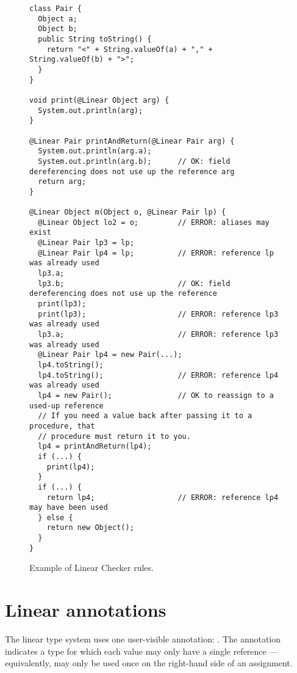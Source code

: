 \begin{figure}
\begin{smaller}
\begin{Verbatim}
class Pair {
  Object a;
  Object b;
  public String toString() {
    return "<" + String.valueOf(a) + "," + String.valueOf(b) + ">";
  }
}

void print(@Linear Object arg) {
  System.out.println(arg);
}

@Linear Pair printAndReturn(@Linear Pair arg) {
  System.out.println(arg.a);
  System.out.println(arg.b);      // OK: field dereferencing does not use up the reference arg
  return arg;
}

@Linear Object m(Object o, @Linear Pair lp) {
  @Linear Object lo2 = o;         // ERROR: aliases may exist
  @Linear Pair lp3 = lp;          
  @Linear Pair lp4 = lp;          // ERROR: reference lp was already used
  lp3.a;                            
  lp3.b;                          // OK: field dereferencing does not use up the reference
  print(lp3);
  print(lp3);                     // ERROR: reference lp3 was already used
  lp3.a;                          // ERROR: reference lp3 was already used
  @Linear Pair lp4 = new Pair(...);
  lp4.toString();
  lp4.toString();                 // ERROR: reference lp4 was already used
  lp4 = new Pair();               // OK to reassign to a used-up reference
  // If you need a value back after passing it to a procedure, that
  // procedure must return it to you.
  lp4 = printAndReturn(lp4);
  if (...) {
    print(lp4);
  }
  if (...) {
    return lp4;                   // ERROR: reference lp4 may have been used
  } else {
    return new Object();
  }
}
\end{Verbatim}
\end{smaller}
\caption{Example of Linear Checker rules.}
\label{fig:linear-example}
\end{figure}


\section{Linear annotations\label{linear-annotations}}

The linear type system uses one user-visible annotation:
.  The annotation indicates
a type for which each value may only have a single reference ---
equivalently, may only be used once on the right-hand side of an
assignment.

